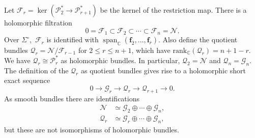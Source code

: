 \documentclass[11pt]{article}
\theoremstyle{definition}
\newcommand{\C}{\mathbb{C}}
\numberwithin{equation}{section}
\begin{document}
Let $\mathcal{F}_r = \ker(\mathcal{P}_2^* \to \mathcal{P}^*_{r+1})$ be the kernel of the restriction map. There is a holomorphic filtration
\begin{equation}\label{eq:normalfilt}
	0 = \mathcal{F}_1 \subset \mathcal{F}_2 \subset \cdots \subset \mathcal{F}_n = \mathcal{N}.
\end{equation}
Over $\Sigma^\circ,$ $\mathcal{F}_r$ is identified with $\operatorname{span}_{\C}(\mathbf{f}_{\overline 2}, \ldots, \mathbf{f}_{\overline{r}}).$  Also define the quotient bundles $\mathcal{Q}_r = \mathcal{N}/\mathcal{F}_{r-1}$ for $2 \leq r \leq n + 1$, which have $\mathrm{rank}_\C(\mathcal{Q}_r) = n+1-r$. We have $\mathcal{Q}_r \cong \mathcal{P}_r^*$ as holomorphic bundles. In particular, $\mathcal{Q}_2 = \mathcal{N}$ and $\mathcal{Q}_n = \mathcal{G}_n.$ The definition of the $\mathcal{Q}_r$ as quotient bundles gives rise to a holomorphic short exact sequence
\begin{equation}\label{eq:Qses}
	0 \to \mathcal{G}_r \to \mathcal{Q}_r \to \mathcal{Q}_{r+1} \to 0.
\end{equation}
As smooth bundles there are identifications
\begin{align}
	\mathcal{N}   & \simeq \mathcal{G}_2 \oplus \cdots \oplus \mathcal{G}_n, \label{eq:Eident} \\
	\mathcal{Q}_r & \simeq \mathcal{G}_r \oplus \cdots \oplus \mathcal{G}_n, \label{eq:Qident} 
\end{align}
but these are not isomorphisms of holomorphic bundles.
\end{document}
